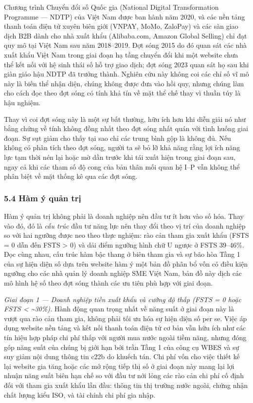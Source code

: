 \documentclass[12pt,a4paper]{article}
\begin{document}
Chương trình Chuyển đổi số Quốc gia (National Digital Transformation
Programme --- NDTP) của Việt Nam được ban hành năm 2020, và các nền tảng
thanh toán điện tử xuyên biên giới (VNPAY, MoMo, ZaloPay) và các sàn
giao dịch B2B dành cho nhà xuất khẩu (Alibaba.com, Amazon Global
Selling) chỉ đạt quy mô tại Việt Nam sau năm 2018--2019. Đợt sóng 2015
do đó quan sát các nhà xuất khẩu Việt Nam trong giai đoạn hạ tầng chuyển
đổi khi một website chưa thể kết nối với hệ sinh thái số hỗ trợ giao
dịch; đợt sóng 2023 quan sát họ sau khi giàn giáo hậu NDTP đã trưởng
thành. Nghiên cứu này không coi các chỉ số vĩ mô này là biến thể nhận
diện, chúng không được đưa vào hồi quy, nhưng chúng làm cho cách đọc
theo đợt sóng có tính khả tín về mặt thể chế thay vì thuần túy là hậu
nghiệm.

Thay vì coi đợt sóng này là một sự bất thường, hữu ích hơn khi diễn giải
nó như bằng chứng về tính không đồng nhất theo đợt sóng nhất quán với
tình huống giai đoạn. Sự sụt giảm cho thấy tại sao chỉ các trung bình
gộp là không đủ. Nếu không có phân tích theo đợt sóng, người ta sẽ bỏ lỡ
khả năng rằng lợi ích năng lực tạm thời nén lại hoặc mờ dần trước khi
tái xuất hiện trong giai đoạn sau, ngay cả khi các tham số độ cong của
bản thân mối quan hệ I--P vẫn không thể phân biệt về mặt thống kê qua
các đợt sóng.

\hypertarget{54-huxe0m-uxfd-quux1ea3n-trux1ecb}{%
\subsubsection{5.4 Hàm ý quản
trị}\label{54-huxe0m-uxfd-quux1ea3n-trux1ecb}}

Hàm ý quản trị không phải là doanh nghiệp nên đầu tư ít hơn vào số hóa.
Thay vào đó, đó là \emph{cấu trúc} đầu tư năng lực nên thay đổi theo vị
trí của doanh nghiệp so với hai ngưỡng được neo theo thực nghiệm: rào
cản tham gia xuất khẩu (FSTS = 0 dẫn đến FSTS \textgreater{} 0) và dải
điểm ngưỡng hình chữ U ngược ở FSTS 39--46\%. Đọc cùng nhau, cấu trúc
hàm bậc thang ở biên tham gia và sự bão hòa Tầng 1 của sự hiện diện số
dựa trên website hàm ý một bản đồ phân bổ vốn có điều kiện ngưỡng cho
các nhà quản lý doanh nghiệp SME Việt Nam, bản đồ này dịch các mô hình
hệ số theo đợt sóng thành các ưu tiên phù hợp với giai đoạn.

\emph{Giai đoạn 1 --- Doanh nghiệp tiền xuất khẩu và cường độ thấp (FSTS
= 0 hoặc FSTS \textless{} \textasciitilde30\%).} Hành động quan trọng
nhất về năng suất ở giai đoạn này là vượt qua rào cản tham gia, không
phải tối ưu hóa sự hiện diện số per se. Việc áp dụng website nền tảng và
kết nối thanh toán điện tử cơ bản vẫn hữu ích như các tín hiệu hợp pháp
chi phí thấp với người mua nước ngoài tiềm năng, nhưng đóng góp năng
suất của chúng bị giới hạn bởi trần Tầng 1 của công cụ WBES và sự suy
giảm nội dung thông tin c22b do khuếch tán. Chi phí vốn cho việc thiết
kế lại website gia tăng hoặc các mở rộng tiếp thị số ở giai đoạn này
mang lại lợi nhuận năng suất biên hạn chế so với đầu tư nới lỏng các rào
cản chi phí cố định đối với tham gia xuất khẩu lần đầu: thông tin thị
trường nước ngoài, chứng nhận chất lượng kiểu ISO, và tài chính chi phí
gia nhập.
\end{document}
